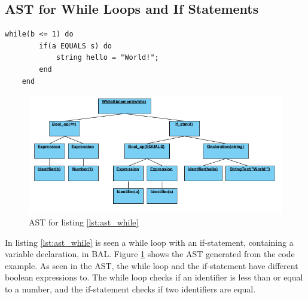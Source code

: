 \subsection{AST for While Loops and If Statements}
\begin{lstlisting}[caption=While loop with if-statement, label=lst:ast_while]
	while(b <= 1) do
		if(a EQUALS s) do
			string hello = "World!";
		end
	end
\end{lstlisting}
\begin{figure}[H]
	\centering
		\includegraphics[width=\textwidth]{billeder/while_AST.png}
		\caption{AST for listing \ref{lst:ast_while}}
		\label{fig:ast_while}
\end{figure}
In listing \ref{lst:ast_while} is seen a while loop with an if-statement, containing a variable declaration, in BAL. Figure \ref{fig:ast_while} shows the AST generated from the code example. As seen in the AST, the while loop and the if-statement have different boolean expressions to. The while loop checks if an identifier is less than or equal to a number, and the if-statement checks if two identifiers are equal.
